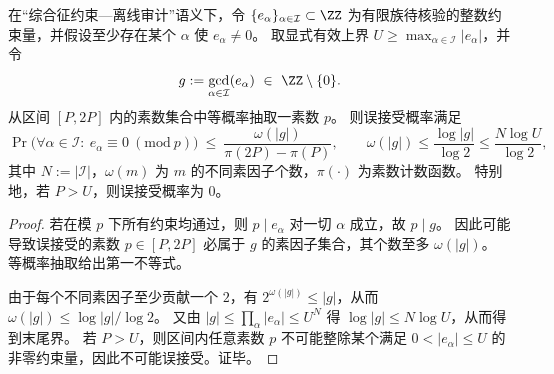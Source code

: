 
\begin{theorem}[随机素数单轮审计的误接受上界]\label{thm:xi-random-prime-single-round-audit-false-accept}
在“综合征约束—离线审计”语义下，令 \(\{e_{\alpha}\}_{\alpha\in\mathcal I}\subset\ZZ\) 为有限族待核验的整数约束量，并假设至少存在某个 \(\alpha\) 使 \(e_\alpha\neq 0\)。
取显式有效上界 \(U\ge \max_{\alpha\in\mathcal I}|e_\alpha|\)，并令
\[
g:=\gcd_{\alpha\in\mathcal I}(e_\alpha)\ \in\ \ZZ\setminus\{0\}.
\]
从区间 \([P,2P]\) 内的素数集合中等概率抽取一素数 \(p\)。
则误接受概率满足
\[
\Pr\bigl(\forall \alpha\in\mathcal I:\ e_\alpha\equiv 0\ (\mathrm{mod}\ p)\bigr)
\ \le\
\frac{\omega(|g|)}{\pi(2P)-\pi(P)},
\qquad
\omega(|g|)\le \frac{\log|g|}{\log 2}\le \frac{N\log U}{\log 2},
\]
其中 \(N:=|\mathcal I|\)，\(\omega(m)\) 为 \(m\) 的不同素因子个数，\(\pi(\cdot)\) 为素数计数函数。
特别地，若 \(P>U\)，则误接受概率为 \(0\)。
\end{theorem}
\begin{proof}
若在模 \(p\) 下所有约束均通过，则 \(p\mid e_\alpha\) 对一切 \(\alpha\) 成立，故 \(p\mid g\)。
因此可能导致误接受的素数 \(p\in[P,2P]\) 必属于 \(g\) 的素因子集合，其个数至多 \(\omega(|g|)\)。
等概率抽取给出第一不等式。
\par
由于每个不同素因子至少贡献一个 \(2\)，有 \(2^{\omega(|g|)}\le |g|\)，从而 \(\omega(|g|)\le \log|g|/\log 2\)。
又由 \(|g|\le \prod_{\alpha}|e_\alpha|\le U^{N}\) 得 \(\log|g|\le N\log U\)，从而得到末尾界。
若 \(P>U\)，则区间内任意素数 \(p\) 不可能整除某个满足 \(0<|e_\alpha|\le U\) 的非零约束量，因此不可能误接受。证毕。
\end{proof}

\endinput
